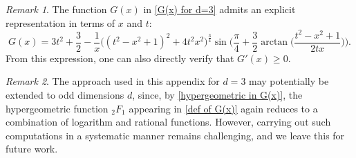 \documentclass[10pt]{amsart}
\theoremstyle{plain}
\theoremstyle{remark}
\newtheorem{rem}{Remark}
\numberwithin{equation}{section}
\begin{document}
\begin{rem} 
The function $G(x)$ in \eqref{G(x) for d=3} admits an explicit representation in terms of $x$ and $t$: 
\begin{equation}
G(x) =   3t^2 + \frac{3}{2}-\frac{1}{x} \Big( (t^2-x^2+1)^2+ 4 t^2 x^2\Big)^{ \frac{3}{4} } \sin \bigg(\frac{\pi}{4}+ \frac{3}{2} \arctan\Big(\frac{t^2-x^2+1}{2
   t x}\Big)\bigg). 
\end{equation}
From this expression, one can also directly verify that $G'(x) \ge 0.$
\end{rem}

\begin{rem}
The approach used in this appendix for \( d=3 \) may potentially be extended
to odd dimensions \( d \), since, by \eqref{hypergeometric in G(x)}, the
hypergeometric function \( {}_2F_1 \) appearing in \eqref{def of G(x)} again
reduces to a combination of logarithm and rational functions. However,
carrying out such computations in a systematic manner remains challenging,
and we leave this for future work. 
\end{rem}




















 



\end{document}
